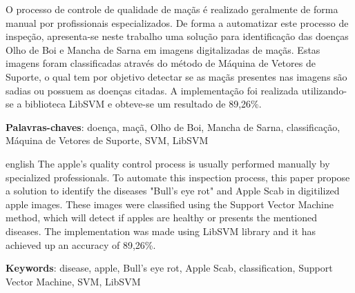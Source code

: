 \setlength{\absparsep}{18pt} %
\begin{resumo}

O processo de controle de qualidade de maçãs é realizado geralmente de forma manual por profissionais especializados. De forma a automatizar este processo de inspeção, apresenta-se neste trabalho uma solução para identificação das doenças Olho de Boi e Mancha de Sarna em imagens digitalizadas de maçãs. Estas imagens foram classificadas através do método de Máquina de Vetores de Suporte, o qual tem por objetivo detectar se as maçãs presentes nas imagens são sadias ou possuem as doenças citadas. A implementação foi realizada utilizando-se a biblioteca LibSVM e obteve-se um resultado de 89,26\%.


 \textbf{Palavras-chaves}: doença, maçã, Olho de Boi, Mancha de Sarna, classificação, Máquina de Vetores de Suporte, SVM, LibSVM
\end{resumo}

\begin{resumo}[Abstract]
 \begin{otherlanguage*}{english}
   The apple's quality control process is usually performed manually by 
specialized professionals. To automate this inspection process, this paper propose a solution to identify the diseases "Bull's eye rot" and Apple Scab in digitilized apple images. These images were classified using the Support Vector Machine method, which will detect if apples are healthy or presents the mentioned diseases. The implementation was made using LibSVM library and it has achieved up an accuracy of 89,26\%.

   \vspace{\onelineskip}
 
   \noindent 
   \textbf{Keywords}: disease, apple, Bull's eye rot, Apple Scab, classification, Support Vector Machine, SVM, LibSVM
 \end{otherlanguage*}
\end{resumo}